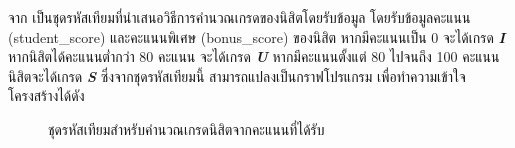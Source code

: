 จาก เป็นชุดรหัสเทียมที่นำเสนอวิธีการคำนวณเกรดของนิสิตโดยรับข้อมูล โดยรับข้อมูลคะแนน (student\_score) 
และคะแนนพิเศษ (bonus\_score) ของนิสิต หากมีคะแนนเป็น 0 จะได้เกรด \emph{{\bf I}} หากนิสิตได้คะแนนต่ำกว่า 80 คะแนน 
จะได้เกรด {\emph{\bf U}} หากมีคะแนนตั้งแต่ 80 ไปจนถึง 100 คะแนน นิสิตจะได้เกรด {\emph{\bf S}} ซึ่งจากชุดรหัสเทียมนี้ 
สามารถแปลงเป็นกราฟโปรแกรม เพื่อทำความเข้าใจโครงสร้างได้ดัง{ 

\begin{figure}[ht!]
    \begin{algorithm}[H]
        \begin{algorithmic}[1]

                \ENDIF
            \ENDIF


            \ENDIF

        \end{algorithmic}
    \end{algorithm}
    \caption{ชุดรหัสเทียมสำหรับคำนวณเกรดนิสิตจากคะแนนที่ได้รับ}
    \label{fig:pseudocodeGrading}
\end{figure}


}
